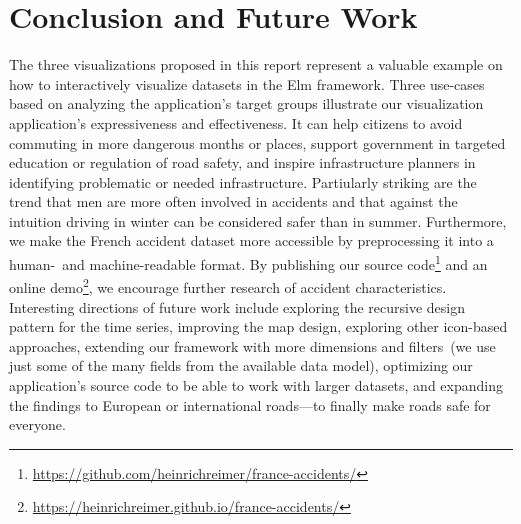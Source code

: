 \section{Conclusion and Future Work}
The three visualizations proposed in this report represent a valuable example on how to interactively visualize datasets in the Elm framework.
Three use-cases based on analyzing the application's target groups illustrate our visualization application's expressiveness and effectiveness.
It can \Ni help citizens to avoid commuting in more dangerous months or places, \Nii support government in targeted education or regulation of road safety, and \Niii inspire infrastructure planners in identifying problematic or needed infrastructure.
Partiularly striking are the trend that men are more often involved in accidents and that against the intuition driving in winter can be considered safer than in summer.
Furthermore, we make the French accident dataset more accessible by preprocessing it into a human-~and machine-readable format.
By publishing our source code\footnote{\url{https://github.com/heinrichreimer/france-accidents/}} and an online demo\footnote{\url{https://heinrichreimer.github.io/france-accidents/}}, we encourage further research of accident characteristics.
Interesting directions of future work include exploring the recursive design pattern for the time series, improving the map design, exploring other icon-based approaches, extending our framework with more dimensions and filters~(we use just some of the many fields from the available data model), optimizing our application's source code to be able to work with larger datasets, and expanding the findings to European or international roads---to finally make roads safe for everyone.
